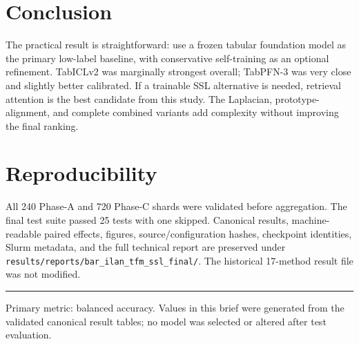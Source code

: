 \documentclass[10pt]{article}
\newcommand{\method}[1]{\texttt{\small #1}}
\begin{document}
\section{Conclusion}

The practical result is straightforward: use a frozen tabular foundation model
as the primary low-label baseline, with conservative self-training as an
optional refinement. TabICLv2 was marginally strongest overall; TabPFN-3 was
very close and slightly better calibrated. If a trainable SSL alternative is
needed, retrieval attention is the best candidate from this study. The
Laplacian, prototype-alignment, and complete combined variants add complexity
without improving the final ranking.

\section{Reproducibility}

All 240 Phase-A and 720 Phase-C shards were validated before aggregation. The
final test suite passed 25 tests with one skipped. Canonical results,
machine-readable paired effects, figures, source/configuration hashes,
checkpoint identities, Slurm metadata, and the full technical report are
preserved under \method{results/reports/bar\_ilan\_tfm\_ssl\_final/}. The
historical 17-method result file was not modified.

\vfill
\hrule
\vspace{1.5mm}
{\footnotesize\sffamily
Primary metric: balanced accuracy. Values in this brief were generated from
the validated canonical result tables; no model was selected or altered after
test evaluation.}
\end{document}

